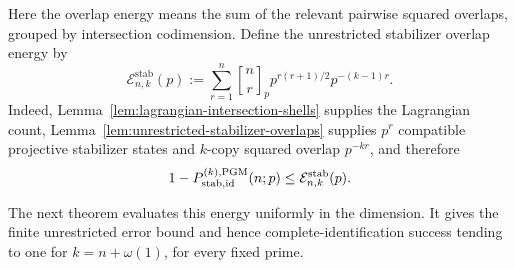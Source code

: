 \documentclass[11pt]{article}
\newcommand{\1}{\mathbf 1}
\newcommand{\PGM}{\mathrm{PGM}}
\theoremstyle{plain}
\theoremstyle{definition}
\theoremstyle{remark}
\begin{document}
Here the overlap energy means the sum of the relevant pairwise squared
overlaps, grouped by intersection codimension.  Define the unrestricted
stabilizer overlap energy by
\begin{equation}
 \mathcal E_{n,k}^{\mathrm{stab}}(p)
 :=\sum_{r=1}^n
 \genfrac{[}{]}{0pt}{}{n}{r}_p
 p^{r(r+1)/2}p^{-(k-1)r}.
 \label{eq:unrestricted-stabilizer-energy}
\end{equation}
Indeed, Lemma~\ref{lem:lagrangian-intersection-shells} supplies the
Lagrangian count, Lemma~\ref{lem:unrestricted-stabilizer-overlaps} supplies
$p^r$ compatible projective stabilizer states and $k$-copy squared overlap
$p^{-kr}$, and
therefore
\begin{equation}
 1-P_{\rm stab,id}^{(k),\PGM}(n;p)
 \le\mathcal E_{n,k}^{\mathrm{stab}}(p).
 \label{eq:unrestricted-stabilizer-pgm-energy-bound}
\end{equation}

The next theorem evaluates this energy uniformly in the dimension.  It gives
the finite unrestricted error bound and hence complete-identification success
tending to one for $k=n+\omega(1)$, for every fixed prime.
\end{document}
